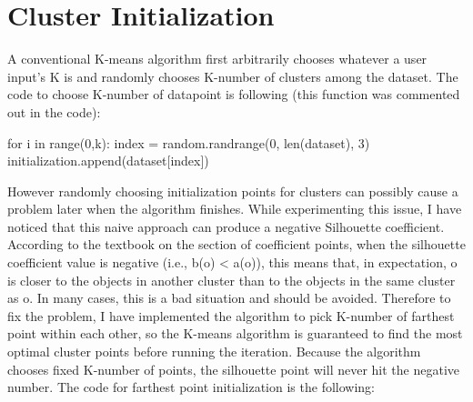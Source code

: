 \documentclass{article}
\begin{document}
\section{Cluster Initialization}
A conventional K-means algorithm first arbitrarily chooses whatever a user input's K is and randomly chooses K-number of clusters among the dataset. The code to choose K-number of datapoint is following (this function was commented out in the code):
\begin{python}
for i in range(0,k):
    index = random.randrange(0, len(dataset), 3)
    initialization.append(dataset[index])
\end{python}
However randomly choosing initialization points for clusters can possibly cause a problem later when the algorithm finishes. While experimenting this issue, I have noticed that this naive approach can produce a negative Silhouette coefficient. According to the textbook on the section of coefficient points, when the silhouette coefficient value is negative (i.e., b(o) < a(o)), this means that, in expectation, o is closer to the objects in another cluster than to the objects in the same cluster as o. 
In many cases, this is a bad situation and should be avoided. Therefore to fix the problem, I have implemented the algorithm to pick K-number of farthest point within each other, so the K-means algorithm is guaranteed to find the most optimal cluster points before running the iteration. Because the algorithm chooses fixed K-number of points, the silhouette point will never hit the negative number. The code for farthest point initialization is the following: 
\end{document}
